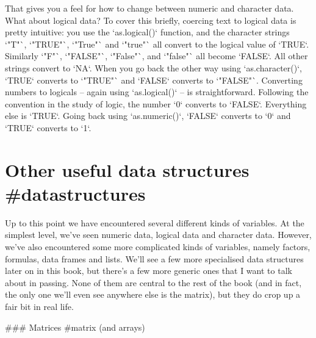 That gives you a feel for how to change between numeric and character data. What about logical data? To cover this briefly, coercing text to logical data is pretty intuitive: you use the `as.logical()` function, and the character strings `"T"`, `"TRUE"`, `"True"` and `"true"` all convert to the logical value of `TRUE`. Similarly `"F"`, `"FALSE"`, `"False"`, and `"false"` all become `FALSE`. All other strings convert to `NA`. When you go back the other way using `as.character()`, `TRUE` converts to `"TRUE"` and `FALSE` converts to `"FALSE"`. Converting numbers to logicals -- again using `as.logical()` -- is straightforward. Following the convention in the study of logic, the number `0` converts to `FALSE`. Everything else is `TRUE`. Going back using `as.numeric()`, `FALSE` converts to `0` and `TRUE` converts to `1`.


\section{Other useful data structures {#datastructures}}

Up to this point we have encountered several different kinds of variables. At the simplest level, we've seen numeric data, logical data and character data. However, we've also encountered some more complicated kinds of variables, namely factors, formulas, data frames and lists. We'll see a few more specialised data structures later on in this book, but there's a few more generic ones that I want to talk about in passing. None of them are central to the rest of the book (and in fact, the only one we'll even see anywhere else is the matrix), but they do crop up a fair bit in real life. 



### Matrices {#matrix (and arrays)}

